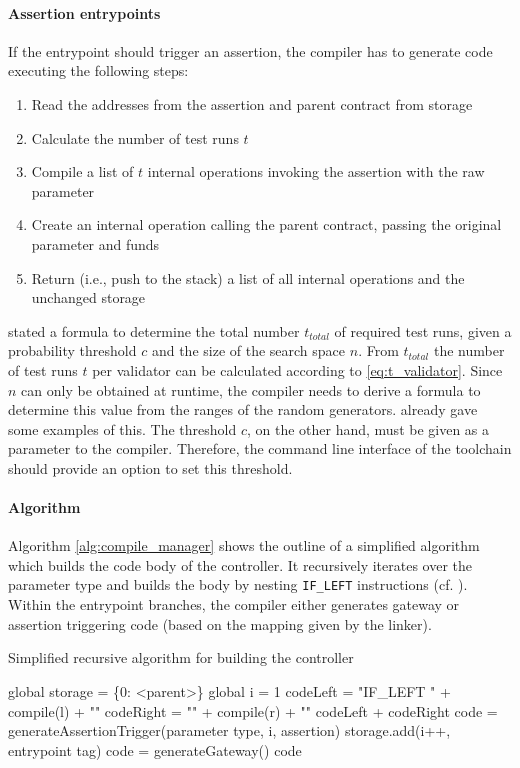 \paragraph{Assertion entrypoints}
If the entrypoint should trigger an assertion, the compiler has to generate code executing the following steps:
\begin{enumerate}
\itemsep-0.5em
\item Read the addresses from the assertion and parent contract from storage
\item Calculate the number of test runs $t$
\item Compile a list of $t$ internal operations invoking the assertion with the raw parameter
\item Create an internal operation calling the parent contract, passing the original parameter and funds
\item Return (i.e., push to the stack) a list of all internal operations and the unchanged storage
\end{enumerate}
 stated a formula to determine the total number $t_{total}$ of required test runs, given a probability threshold $c$ and the size of the search space $n$. From $t_{total}$ the number of test runs $t$ per validator can be calculated according to \eqref{eq:t_validator}. Since $n$ can only be obtained at runtime, the compiler needs to derive a formula to determine this value from the ranges of the random generators.  already gave some examples of this. 
The threshold $c$, on the other hand, must be given as a parameter to the compiler. Therefore, the command line interface of the toolchain should provide an option to set this threshold.

\paragraph{Algorithm}
Algorithm \ref{alg:compile_manager} shows the outline of a simplified algorithm which builds the code body of the controller. It recursively iterates over the parameter type and builds the body by nesting \texttt{IF\_LEFT} instructions (cf. ). Within the entrypoint branches, the compiler either generates gateway or assertion triggering code (based on the mapping given by the linker).

\begin{algorithm}
\caption{Simplified recursive algorithm for building the controller}\label{alg:compile_manager}
	\begin{algorithmic}[1]
	\State global storage = \{0: <parent>\}
	\State global i = 1
	\State codeLeft = "IF\_LEFT {" + compile(l) + "}"
	\State codeRight = "{" + compile(r) + "}"
	\State \Return codeLeft + codeRight
	\Else
	\State code = generateAssertionTrigger(parameter type, i, assertion)
	\State storage.add(i++, entrypoint tag)
	\Else
	\State code = generateGateway()
	\EndIf
	\State \Return code
	\EndIf
	\EndFunction
	\end{algorithmic}
\end{algorithm}

